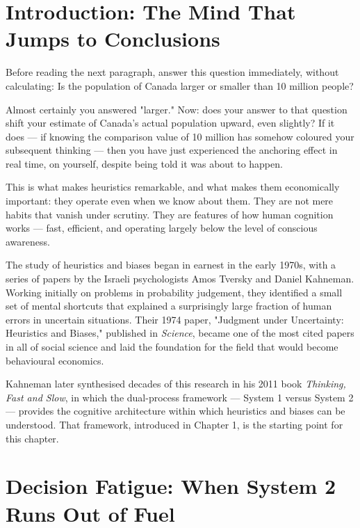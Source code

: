 \documentclass[12pt, letterpaper]{article}
\begin{document}
\newpage


\section*{Introduction: The Mind That Jumps to Conclusions}


Before reading the next paragraph, answer this question immediately, without calculating: Is the population of Canada larger or smaller than 10 million people?

Almost certainly you answered "larger." Now: does your answer to that question shift your estimate of Canada's actual population upward, even slightly? If it does --- if knowing the comparison value of 10 million has somehow coloured your subsequent thinking --- then you have just experienced the anchoring effect in real time, on yourself, despite being told it was about to happen.

This is what makes heuristics remarkable, and what makes them economically important: they operate even when we know about them. They are not mere habits that vanish under scrutiny. They are features of how human cognition works --- fast, efficient, and operating largely below the level of conscious awareness.

The study of heuristics and biases began in earnest in the early 1970s, with a series of papers by the Israeli psychologists Amos Tversky and Daniel Kahneman. Working initially on problems in probability judgement, they identified a small set of mental shortcuts that explained a surprisingly large fraction of human errors in uncertain situations. Their 1974 paper, "Judgment under Uncertainty: Heuristics and Biases," published in \textit{Science}, became one of the most cited papers in all of social science and laid the foundation for the field that would become behavioural economics.

Kahneman later synthesised decades of this research in his 2011 book \textit{Thinking, Fast and Slow}, in which the dual-process framework --- System 1 versus System 2 --- provides the cognitive architecture within which heuristics and biases can be understood. That framework, introduced in Chapter 1, is the starting point for this chapter.

\medskip


\section{Decision Fatigue: When System 2 Runs Out of Fuel}
\end{document}

